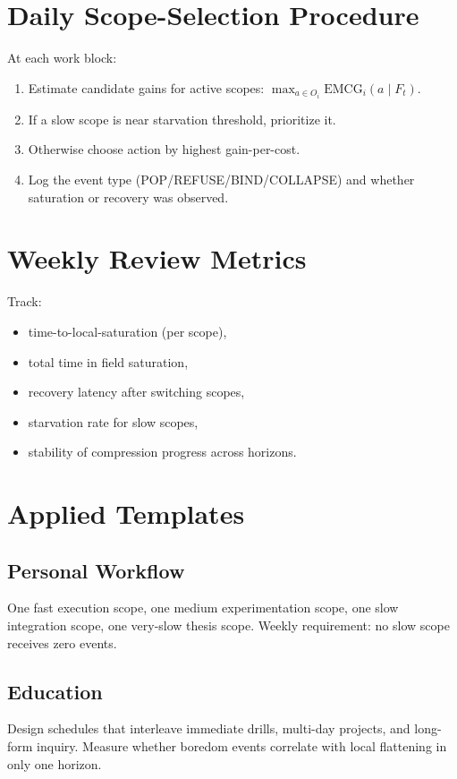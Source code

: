 \documentclass[11pt]{article}
\begin{document}
\section{Daily Scope-Selection Procedure}

At each work block:
\begin{enumerate}[leftmargin=*]
  \item Estimate candidate gains for active scopes: $\max_{a\in O_i}\mathrm{EMCG}_i(a\mid F_t)$.
  \item If a slow scope is near starvation threshold, prioritize it.
  \item Otherwise choose action by highest gain-per-cost.
  \item Log the event type (POP/REFUSE/BIND/COLLAPSE) and whether saturation or recovery was observed.
\end{enumerate}

\section{Weekly Review Metrics}

Track:
\begin{itemize}[leftmargin=*]
  \item time-to-local-saturation (per scope),
  \item total time in field saturation,
  \item recovery latency after switching scopes,
  \item starvation rate for slow scopes,
  \item stability of compression progress across horizons.
\end{itemize}

\section{Applied Templates}

\subsection*{Personal Workflow}
One fast execution scope, one medium experimentation scope, one slow integration scope,
one very-slow thesis scope. Weekly requirement: no slow scope receives zero events.

\subsection*{Education}
Design schedules that interleave immediate drills, multi-day projects, and long-form inquiry.
Measure whether boredom events correlate with local flattening in only one horizon.
\end{document}
